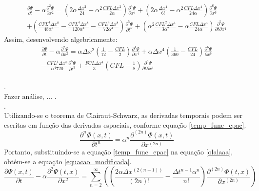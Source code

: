 \documentclass[10pt,twoside,a4paper]{article}
\begin{document}
\begin{equation}
\begin{split}
\frac{\partial \Psi}{\partial t} - \alpha \frac{\partial^2 \Psi}{\partial x^2} = \left(2\alpha \frac{\Delta x^2}{24}-\alpha ^2 \frac{CFL \Delta x^2}{2\alpha}\right)
\frac{\partial ^4 \Psi}{\partial x ^4} + \left(2\alpha \frac{\Delta x^4}{6!}-\alpha ^2 \frac{CFL\Delta x^4}{24\alpha}\right)\frac{\partial ^6 \Psi}{\partial x ^6}\\
+ \left( \frac{CFL^4 \Delta x^8}{48\alpha^4} -\frac{CFL^4 \Delta x^8}{120\alpha^4} - \frac{CFL^4 \Delta x^8}{72\alpha^4} \right)\frac{\partial^5 \Psi}{\partial t^5} 
+ \left(\alpha^2 \frac{CFL^2 \Delta x^4}{3\alpha^2}-\alpha \frac{CFL \Delta x^4}{24\alpha}\right)\frac{\partial ^5 \Psi}{\partial t \partial x ^4}
\end{split}
\end{equation}
Assim, desenvolvendo algebricamente:
\begin{equation}
\begin{split}
\frac{\partial \Psi}{\partial t} - \alpha \frac{\partial^2 \Psi}{\partial x^2} = \alpha\Delta x^2 \left(\frac{1}{12}-\frac{CFL}{2}\right)
\frac{\partial ^4 \Psi}{\partial x ^4} + \alpha \Delta x ^4\left(\frac{1}{360}-\frac{CFL}{24}\right)\frac{\partial ^6 \Psi}{\partial x ^6}\\
- \frac{CFL^4 \Delta x ^8 }{\alpha^4 720} \frac{\partial^5 \Psi}{\partial t^5} 
+ \frac{FCL \Delta x ^4}{3}\left(CFL - \frac{1}{8}\right)\frac{\partial ^5 \Psi}{\partial t \partial x ^4}
\end{split}
\end{equation}
\\
. \\ 
Fazer análise, ...
. \\
. \\
Utilizando-se o teorema de Clairaut-Schwarz, as derivadas temporais podem ser escritas em função das derivadas espaciais, conforme equação \ref{temp_func_epac}.
\begin{equation} \label{temp_func_epac}
\frac{\partial^{n} \Phi \left( x,t \right)}{\partial t^{n}} =  \alpha^{n} \frac{\partial^{\left(2n\right)} \Phi \left( x,t \right)}{\partial x^{\left(2n\right)}}
\end{equation}
Portanto, substituindo-se a equação \ref{temp_func_epac} na equação \ref{olalaaa}, obtém-se a equação \ref{equacao_modificada}.
\begin{equation} \label{equacao_modificada}
\frac{\partial \Psi \left( x,t \right)}{\partial t} - \alpha \frac{\partial^{2} \Psi \left(t, x\right)}{\partial x^{2}}= 
 \sum\limits_{n=2}^{\infty}\left( \left(\frac{ 2 \alpha \Delta x^{\left(2\left(n-1\right)\right)}}{\left(2n\right)!} -\frac{\Delta t^{n-1} \alpha^{n}}{n!}\right) \frac{\partial^{\left(2n\right)} \Phi \left(t, x\right)}{\partial x^{\left(2n\right)}}\right)
\end{equation}
\end{document}
